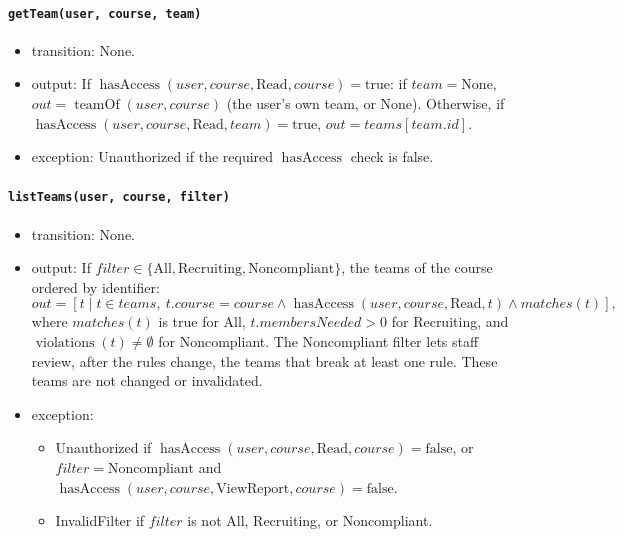 \documentclass[12pt, titlepage]{article}
\begin{document}
\paragraph{\texttt{getTeam(user, course, team)}}
\begin{itemize}
    \item transition: None.
    \item output: If $\operatorname{hasAccess}(user,course,\text{Read},course)=\text{true}$: if $team=\text{None}$, $out=\operatorname{teamOf}(user,course)$ (the user's own team, or None). Otherwise, if $\operatorname{hasAccess}(user,course,\text{Read},team)=\text{true}$, $out=\mathit{teams}[team.id]$.
    \item exception: Unauthorized if the required $\operatorname{hasAccess}$ check is false.
\end{itemize}

\paragraph{\texttt{listTeams(user, course, filter)}}
\begin{itemize}
    \item transition: None.
    \item output: If $filter\in\{\text{All},\text{Recruiting},\text{Noncompliant}\}$, the teams of the course ordered by identifier:
    \[
    out=[t\mid t\in\mathit{teams},\ t.course=course\land\operatorname{hasAccess}(user,course,\text{Read},t)\land\mathit{matches}(t)],
    \]
    where $\mathit{matches}(t)$ is true for All, $t.membersNeeded>0$ for Recruiting, and $\operatorname{violations}(t)\ne\emptyset$ for Noncompliant. The Noncompliant filter lets staff review, after the rules change, the teams that break at least one rule. These teams are not changed or invalidated.
    \item exception:
    \begin{itemize}
        \item Unauthorized if $\operatorname{hasAccess}(user,course,\text{Read},course)=\text{false}$, or $filter=\text{Noncompliant}$ and $\operatorname{hasAccess}(user,course,\text{ViewReport},course)=\text{false}$.
        \item InvalidFilter if $filter$ is not All, Recruiting, or Noncompliant.
    \end{itemize}
\end{itemize}
\end{document}

